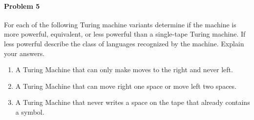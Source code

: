 \documentclass{article}
\begin{document}
    


\paragraph{Problem 5} For each of the following Turing machine variants determine if the machine
is more powerful, equivalent, or less powerful than a single-tape Turing machine. If less powerful
describe the class of languages recognized by the machine. Explain your answers.
\begin{enumerate}[\indent a)]
    \item A Turing Machine that can only make moves to the right and never left.
    \item A Turing Machine that can move right one space or move left two spaces.
    \item A Turing Machine that never writes a space on the tape that already contains a symbol.
\end{enumerate}
\end{document}
